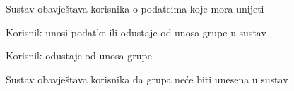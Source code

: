 \begin{packed_item}
\begin{packed_item}
\begin{packed_enum}
								\item Sustav obavještava korisnika o podatcima koje mora unijeti
								\item Korisnik unosi podatke ili odustaje od unosa grupe u sustav
								
							\end{packed_enum}
							\item[3.a] Korisnik odustaje od unosa grupe
							\item[] \begin{packed_enum}
								
								\item Sustav obavještava korisnika da grupa neće biti unesena u sustav
								
							\end{packed_enum}
							
						\end{packed_item}
					\end{packed_item}
					
